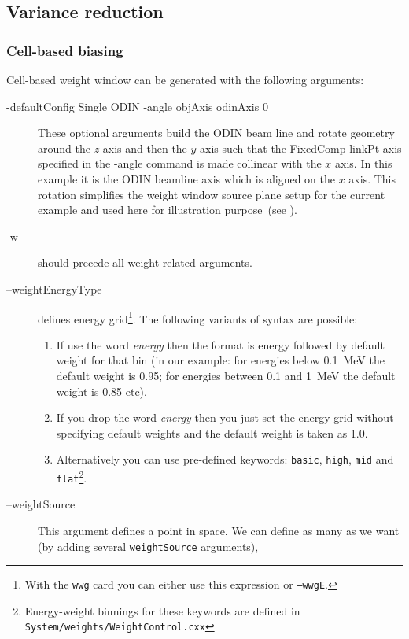 \subsection{Variance reduction}
\subsubsection{Cell-based biasing}
\label{sec:vr:cell}

Cell-based weight window can be generated with the following arguments:



\begin{description}
\item[-defaultConfig Single ODIN -angle objAxis odinAxis 0] These optional arguments build the ODIN beam line
  and rotate geometry around the $z$ axis and then the $y$ axis such that the FixedComp linkPt axis specified
  in the -angle command is made collinear with the $x$ axis.
  In this example it is the ODIN beamline axis which is aligned on the $x$ axis.
  This rotation simplifies the weight window source plane setup for the current example and used here for
  illustration purpose~(see ).
\item[-w] should precede all weight-related arguments.
\item[--weightEnergyType] defines energy grid\footnote{With the {\tt wwg} card you can either use this expression or {\tt --wwgE}.}.
  The following variants of syntax are possible:
  \begin{enumerate}
    \item If use the word {\em energy} then the format is energy followed by default weight for that bin
      (in our example: for energies below \SI{0.1}{\mega\electronvolt} the default weight is \num{0.95};
          for energies between \num{0.1} and \SI{1}{\mega\electronvolt} the default weight is \num{0.85} etc).
    \item If you drop the word {\em energy} then you just set the energy grid without specifying default weights and the default weight is taken as 1.0.
    \item Alternatively you can use pre-defined keywords:
      {\tt basic}, {\tt high}, {\tt mid} and {\tt flat}\footnote{Energy-weight binnings for these keywords are defined in \tt{System/weights/WeightControl.cxx}}.
    \end{enumerate}
\item[--weightSource] This argument defines a point in space. We can define as many as we want (by adding several {\tt weightSource} arguments),

\end{description}
